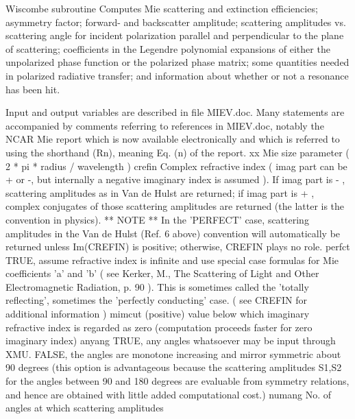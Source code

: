 \begin{DoxyVerb}Wiscombe subroutine
Computes Mie scattering and extinction efficiencies; asymmetry
factor;  forward- and backscatter amplitude;  scattering
amplitudes vs. scattering angle for incident polarization parallel
and perpendicular to the plane of scattering;
coefficients in the Legendre polynomial expansions of either the
unpolarized phase function or the polarized phase matrix;
some quantities needed in polarized radiative transfer;  and
information about whether or not a resonance has been hit.

Input and output variables are described in file MIEV.doc.
Many statements are accompanied by comments referring to
references in MIEV.doc, notably the NCAR Mie report which is now
available electronically and which is referred to using the
shorthand (Rn), meaning Eq. (n) of the report.
    xx      Mie size parameter ( 2 * pi * radius / wavelength )
    crefin  Complex refractive index ( imag part can be + or -,
            but internally a negative imaginary index is assumed ).
            If imag part is - ,  scattering amplitudes as in Van
            de Hulst are returned;  if imag part is + , complex
            conjugates of those scattering amplitudes are returned
            (the latter is the convention in physics).
            ** NOTE ** In the 'PERFECT' case, scattering amplitudes
            in the Van de Hulst (Ref. 6 above) convention will
            automatically be returned unless  Im(CREFIN)  is
            positive;  otherwise, CREFIN plays no role.
    perfct  TRUE, assume refractive index is infinite and use
            special case formulas for Mie coefficients  'a'
            and  'b'  ( see Kerker, M., The Scattering of
            Light and Other Electromagnetic Radiation, p. 90 ).
            This is sometimes called the 'totally reflecting',
            sometimes the 'perfectly conducting' case.
            ( see CREFIN for additional information )
    mimcut  (positive) value below which imaginary refractive
            index is regarded as zero (computation proceeds
            faster for zero imaginary index)
    anyang  TRUE, any angles whatsoever may be input through
            XMU.  FALSE, the angles are monotone increasing
            and mirror symmetric about 90 degrees (this option
            is advantageous because the scattering amplitudes
            S1,S2 for the angles between 90 and 180 degrees
            are evaluable from symmetry relations, and hence
            are obtained with little added computational cost.)
    numang  No. of angles at which scattering amplitudes

\end{DoxyVerb}
